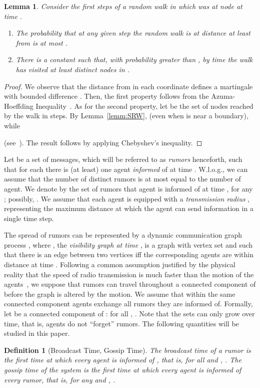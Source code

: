 \documentclass[11pt]{article}
\newcommand{\newterm}[1]{\emph{#1}}
\newtheorem{defi}{Definition}
\newtheorem{lemm}{Lemma}
\begin{document}
\begin{lemm}
\label{lemm:props}
Consider the first  steps of a random walk in  which was at
node  at time .
\begin{enumerate}
\item\label{poin:dev} 
The probability that at any given step  the random
walk is at distance at least  from  is
at most .
\item\label{poin:range} 
There is a constant  such that, with probability greater than
, by time  the walk has visited at least  distinct nodes in .
\end{enumerate}
\end{lemm}
\begin{proof}
We observe that the distance from  in each coordinate defines a
martingale with bounded difference .  Then, the first property
follows from the Azuma-Hoeffding Inequality~\cite[Theorem 2.6]{MitzenmacherU05}.
As for the second property, let  be
the set of nodes reached by the walk in  steps.  By
Lemma~\ref{lemm:SRW},  (even
when  is near a boundary), while

(see~\cite{Torney86}). The result follows by applying Chebyshev's
inequality.
\end{proof}

Let  be a set of messages, which will be referred to as
\newterm{rumors} henceforth, such that for each  there is (at
least) one agent \newterm{informed} of  at time .  W.l.o.g.,
we can assume that the number of distinct rumors is at most equal to
the number of agent.  We denote by  the set of rumors that
agent  is informed of at time , for any ;
possibly, .  We assume that each agent is
equipped with a \newterm{transmission radius} , representing
the maximum distance at which the agent can send information in a
single time step.

The spread of rumors can be represented by a dynamic communication
graph process \sloppy , where , the
\newterm{visibility graph at time }, is a graph with vertex set 
and such that there is an edge between two vertices iff the
corresponding agents are within distance  at time .
Following a
common assumption justified by the physical reality that the speed of
radio transmission is much faster than the motion of the
agents~\cite{PeresSSS11}, we suppose that rumors can travel throughout
a connected component of  before the graph is altered by the
motion.  We assume that within the same connected component agents
exchange all rumors they are informed of.  Formally, let  be a
connected component of : for all , .  Note that the sets 
can only grow over time, that is, agents do not ``forget'' rumors.
The following quantities will be studied in this paper.
\begin{defi}[Broadcast Time, Gossip Time]
The \newterm{broadcast time}  of a rumor  is the
first time at which every agent is informed of , that is, for all
 and , .  The
\newterm{gossip time}  of the system is the first time at
which every agent is informed of every rumor, that is, for any  and , .
\end{defi}
\end{document}
